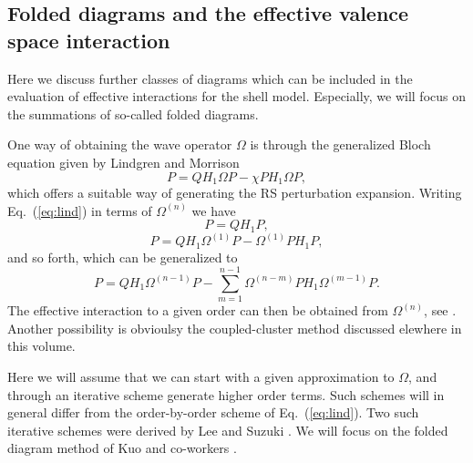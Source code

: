 \subsection{Folded diagrams and the effective valence space interaction}

Here we discuss further classes of diagrams
which can be included in the evaluation of effective interactions
for the shell model.
Especially, we will focus on the summations of so-called folded
diagrams.

One way of obtaining the wave operator 
$\Omega$ is through the generalized Bloch
equation given by Lindgren and Morrison \cite{lm85}
\begin{equation}
[\Omega, H_0]P=QH_1\Omega P-\chi PH_1\Omega P,
\label{eq:lind}
\end{equation}
which offers a suitable way of generating the RS perturbation expansion.
Writing Eq.\ (\ref{eq:lind}) in terms of $\Omega^{(n)}$ we have
\begin{equation}
[\Omega^{(1)}, H_0]P=QH_1P,
\end{equation}
\begin{equation}
[\Omega^{(2)}, H_0]P=QH_1\Omega^{(1)} P- \Omega^{(1)} PH_1P,
\end{equation}
and so forth,  which can be generalized to
\begin{equation}
[\Omega^{(n)}, H_0]P=QH_1\Omega^{(n-1)} P- \sum_{m=1}^{n-1}
\Omega^{(n-m)} PH_1\Omega^{(m-1)}P.
\end{equation}
The effective interaction to a given order can then be obtained from
$\Omega^{(n)}$, see \cite{lm85}.
Another possibility is obvioulsy the coupled-cluster method discussed
elewhere in this volume.

Here we will assume that we can start with a given
approximation to $\Omega$, and through an iterative scheme generate
higher order terms. Such schemes will in general differ from the
order-by-order scheme of Eq.\ (\ref{eq:lind}).  Two such iterative
schemes were derived  by Lee and Suzuki \cite{ls80}. We will focus
on the folded diagram method of Kuo and co-workers \cite{ko90}.

